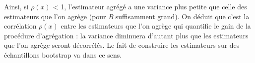 \begin{small}
	Ainsi, si $\rho(x)$ < 1, l’estimateur agrégé a une variance plus petite que celle des estimateurs que l’on
	agrège (pour \textit{B} suffisamment grand). On déduit que c’est la corrélation $\rho(x)$ entre les estimateurs que l’on agrège qui quantifie le gain de la procédure d’agrégation : la variance diminuera d’autant plus que les estimateurs que l’on agrège seront décorrélés. Le fait de construire les estimateurs sur des échantillons bootstrap va dans ce sens.
		\end{small}
		
